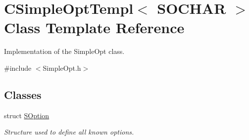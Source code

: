 \hypertarget{class_c_simple_opt_templ}{\section{C\-Simple\-Opt\-Templ$<$ S\-O\-C\-H\-A\-R $>$ Class Template Reference}
\label{class_c_simple_opt_templ}
}


Implementation of the Simple\-Opt class.  




{\ttfamily \#include $<$Simple\-Opt.\-h$>$}

\subsection*{Classes}
\begin{DoxyCompactItemize}
\item 
struct \hyperlink{struct_c_simple_opt_templ_1_1_s_option}{S\-Option}
\begin{DoxyCompactList}\small\item\em Structure used to define all known options. \end{DoxyCompactList}\end{DoxyCompactItemize}
